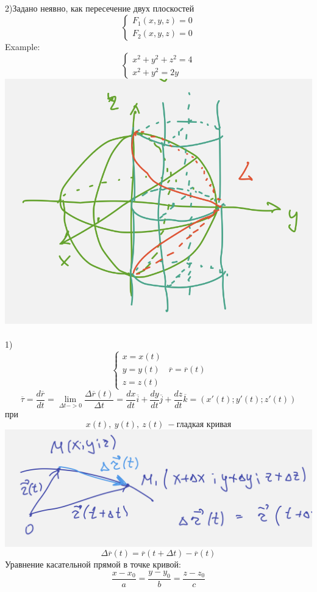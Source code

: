 \documentclass{article}
\begin{document}
2)Задано неявно, как пересечение двух плоскостей
\begin{equation*}
    \begin{cases}
        F_1(x,y,z) = 0\\
        F_2(x,y,z) = 0
    \end{cases}
\end{equation*}
Example:
\begin{equation*}
    \begin{cases}
        x^2+y^2+z^2=4\\
        x^2+y^2=2y
    \end{cases}
\end{equation*}
\includegraphics[width=.3\textwidth]{neyavno2.png} 
\\ \\
1) 
\begin{equation*}
    \begin{cases}
        x = x(t)\\
        y=y(t)\\
        z=z(t)
    \end{cases}
    \ \ \overline{r} = \overline{r}(t)
\end{equation*}
\begin{equation*}
    \overline{\tau} = \frac{d\overline{r}}{dt} = \lim_{\Delta t->0}\frac{\Delta \overline{r}(t)}{\Delta t} = \frac{dx}{dt}\overline{i}+\frac{dy}{dt}\overline{j}+\frac{dz}{dt}\overline{k} = (x'(t); y'(t); z'(t))
\end{equation*}
при
\begin{equation*}
    x(t),\ y(t),\ z(t)\ - \text{гладкая кривая}
\end{equation*}
\includegraphics[width=.3\textwidth]{kas}
\begin{equation*}
    \Delta \overline{r}(t)= \overline{r}(t+\Delta t) - \overline{r}(t)
\end{equation*}
Уравнение касательной прямой в точке кривой:
\begin{equation*}
    \frac{x-x_0}{a} = \frac{y-y_0}{b} = \frac{z-z_0}{c}
\end{equation*}
\end{document}
